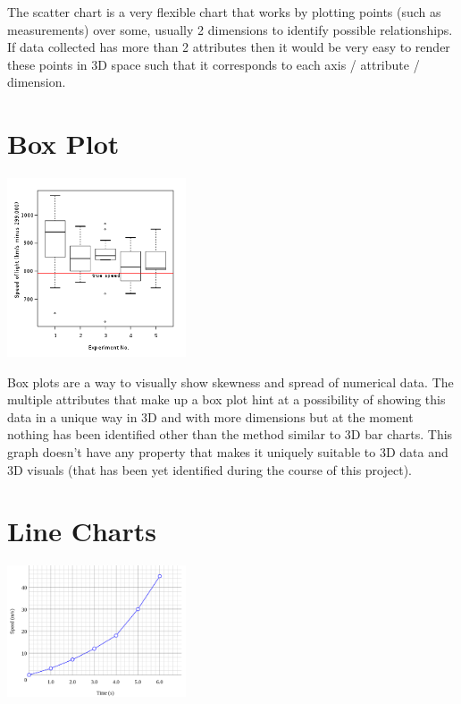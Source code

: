 \documentclass{report}
\begin{document}
The scatter chart is a very flexible chart that works by plotting points (such as measurements) over some, usually 2 dimensions to identify possible relationships. If data collected has more than 2 attributes then it would be very easy to render these points in 3D space such that it corresponds to each axis / attribute / dimension. 

\section{Box Plot}
\begin{center}
    \includegraphics[width=150pt]{330px-Michelsonmorley-boxplot.svg.png}
\end{center}

Box plots are a way to visually show skewness and spread of numerical data. The multiple attributes that make up a box plot hint at a possibility of showing this data in a unique way in 3D and with more dimensions but at the moment nothing has been identified other than the method similar to 3D bar charts. This graph doesn't have any property that makes it uniquely suitable to 3D data and 3D visuals (that has been yet identified during the course of this project).

\section{Line Charts}
\begin{center}
    \includegraphics[width=150pt]{ScientificGraphSpeedVsTime.svg.png}
\end{center}
\end{document}
